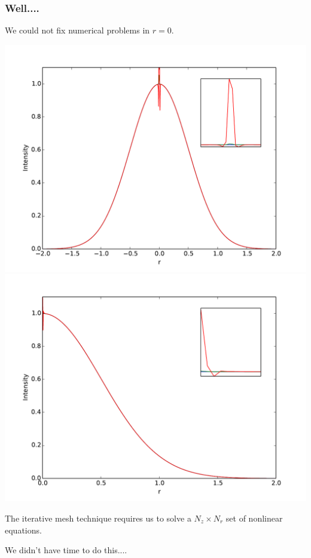 \begin{frame}
  \frametitle{Well....}
  We could not fix numerical problems in $r = 0$. \bigskip

  \includegraphics[width=0.45\columnwidth]{kerr_double} \hfill \includegraphics[width=0.45\columnwidth]{kerr_single}

  The iterative mesh technique requires us to solve a $N_{z} \times N_{r}$ set of nonlinear
  equations.

  We didn't have time to do this....
\end{frame}
